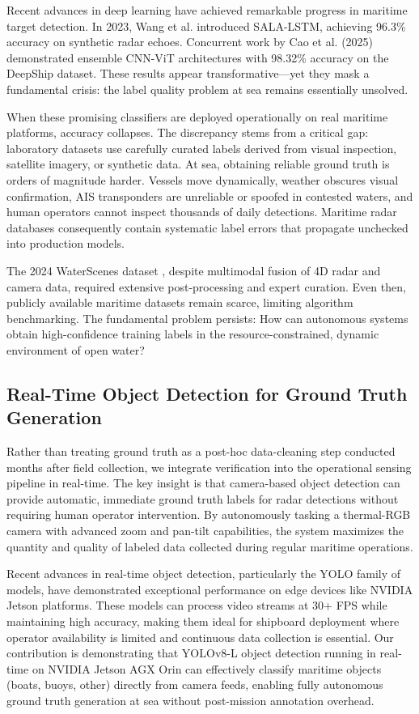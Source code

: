\documentclass[twocolumn, 10pt]{article}
\begin{document}
Recent advances in deep learning have achieved remarkable progress in maritime target detection. In 2023, Wang et al. \cite{Wang2023SALALSTM} introduced SALA-LSTM, achieving 96.3\% accuracy on synthetic radar echoes. Concurrent work by Cao et al. (2025) \cite{Cao2025VesselCNN} demonstrated ensemble CNN-ViT architectures with 98.32\% accuracy on the DeepShip dataset. These results appear transformative---yet they mask a fundamental crisis: the label quality problem at sea remains essentially unsolved.

When these promising classifiers are deployed operationally on real maritime platforms, accuracy collapses. The discrepancy stems from a critical gap: laboratory datasets use carefully curated labels derived from visual inspection, satellite imagery, or synthetic data. At sea, obtaining reliable ground truth is orders of magnitude harder. Vessels move dynamically, weather obscures visual confirmation, AIS transponders are unreliable or spoofed in contested waters, and human operators cannot inspect thousands of daily detections. Maritime radar databases consequently contain systematic label errors that propagate unchecked into production models.

The 2024 WaterScenes dataset \cite{Zhang2024WaterScenes}, despite multimodal fusion of 4D radar and camera data, required extensive post-processing and expert curation. Even then, publicly available maritime datasets remain scarce, limiting algorithm benchmarking. The fundamental problem persists: How can autonomous systems obtain high-confidence training labels in the resource-constrained, dynamic environment of open water?

\subsection{Real-Time Object Detection for Ground Truth Generation}

Rather than treating ground truth as a post-hoc data-cleaning step conducted months after field collection, we integrate verification into the operational sensing pipeline in real-time. The key insight is that camera-based object detection can provide automatic, immediate ground truth labels for radar detections without requiring human operator intervention. By autonomously tasking a thermal-RGB camera with advanced zoom and pan-tilt capabilities, the system maximizes the quantity and quality of labeled data collected during regular maritime operations.

Recent advances in real-time object detection, particularly the YOLO family of models, have demonstrated exceptional performance on edge devices like NVIDIA Jetson platforms. These models can process video streams at 30+ FPS while maintaining high accuracy, making them ideal for shipboard deployment where operator availability is limited and continuous data collection is essential. Our contribution is demonstrating that YOLOv8-L object detection running in real-time on NVIDIA Jetson AGX Orin can effectively classify maritime objects (boats, buoys, other) directly from camera feeds, enabling fully autonomous ground truth generation at sea without post-mission annotation overhead.
\end{document}
